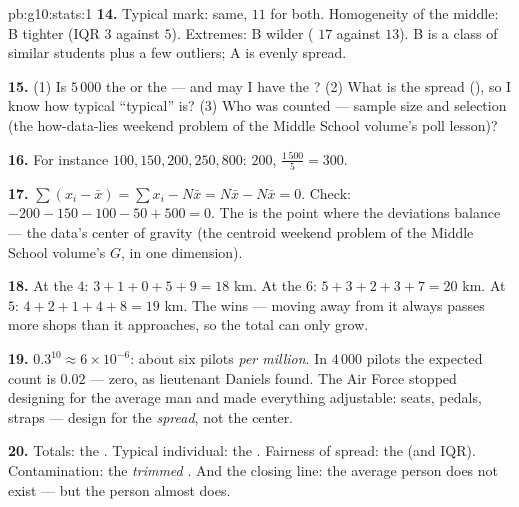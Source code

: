 \begin{solution}{pb:g10:stats:1}
\textbf{14.} Typical mark: same,  $11$ for both.
Homogeneity of the middle: B tighter (IQR $3$ against $5$).
Extremes: B wilder ( $17$ against $13$). B is a class of
similar students plus a few outliers; A is evenly spread.

\textbf{15.} (1) Is $5\,000$ the  or the  --- and may
I have the ? (2) What is the spread (), so I
know how typical ``typical'' is? (3) Who was counted --- sample
size and selection (the how-data-lies weekend problem of the Middle School volume's poll lesson)?

\textbf{16.} For instance $100, 150, 200, 250, 800$: 
$200$,  $\frac{1\,500}{5} = 300$.

\textbf{17.} $\sum (x_i - \bar x) = \sum x_i - N \bar x =
N\bar x - N\bar x = 0$. Check: $-200 - 150 - 100 - 50 + 500 =
0$. The  is the point where the deviations balance --- the
data's center of gravity (the centroid weekend problem of the Middle School volume's $G$, in
one dimension).

\textbf{18.} At the  $4$: $3 + 1 + 0 + 5 + 9 = 18$ km. At
the  $6$: $5 + 3 + 2 + 3 + 7 = 20$ km. At $5$:
$4 + 2 + 1 + 4 + 8 = 19$ km. The  wins --- moving away
from it always passes more shops than it approaches, so the
total can only grow.

\textbf{19.} $0.3^{10} \approx 6 \times 10^{-6}$: about six
pilots \emph{per million}. In $4\,000$ pilots the expected
count is $0.02$ --- zero, as lieutenant Daniels found. The Air
Force stopped designing for the average man and made
everything adjustable: seats, pedals, straps --- design for the
\emph{spread}, not the center.

\textbf{20.} Totals: the \emph{}. Typical individual: the
\emph{}. Fairness of spread: the \emph{} (and
IQR). Contamination: the \emph{trimmed }. And the closing
line: the average person does not exist --- but the 
person almost does.
\end{solution}
